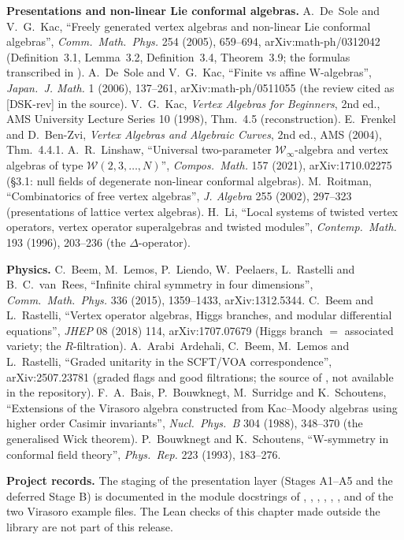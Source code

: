 \textbf{Presentations and non-linear Lie conformal algebras.} A.~De~Sole and V.~G.~Kac, ``Freely generated vertex algebras and
non-linear Lie conformal algebras'', \emph{Comm.\ Math.\ Phys.} 254 (2005), 659--694, arXiv:math-ph/0312042 (Definition~3.1,
Lemma~3.2, Definition~3.4, Theorem~3.9; the formulas transcribed in ). A.~De~Sole and V.~G.~Kac, ``Finite vs affine
W-algebras'', \emph{Japan.\ J. Math.} 1 (2006), 137--261, arXiv:math-ph/0511055 (the review cited as [DSK-rev] in the source).
V.~G.~Kac, \emph{Vertex Algebras for Beginners}, 2nd ed., AMS University Lecture Series 10 (1998), Thm.~4.5 (reconstruction).
E.~Frenkel and D.~Ben-Zvi, \emph{Vertex Algebras and Algebraic Curves}, 2nd ed., AMS (2004), Thm.~4.4.1. A.~R.~Linshaw,
``Universal two-parameter $\mathcal W_\infty$-algebra and vertex algebras of type $\mathcal W(2,3,\dots,N)$'', \emph{Compos.\ Math.} 157
(2021), arXiv:1710.02275 (§3.1: null fields of degenerate non-linear conformal algebras). M.~Roitman, ``Combinatorics of free vertex
algebras'', \emph{J. Algebra} 255 (2002), 297--323 (presentations of lattice vertex algebras). H.~Li, ``Local systems of twisted
vertex operators, vertex operator superalgebras and twisted modules'', \emph{Contemp.\ Math.} 193 (1996), 203--236 (the
$\Delta$-operator).

\textbf{Physics.} C.~Beem, M.~Lemos, P.~Liendo, W.~Peelaers, L.~Rastelli and B.~C.~van~Rees, ``Infinite chiral symmetry in four
dimensions'', \emph{Comm.\ Math.\ Phys.} 336 (2015), 1359--1433, arXiv:1312.5344. C.~Beem and L.~Rastelli, ``Vertex operator
algebras, Higgs branches, and modular differential equations'', \emph{JHEP} 08 (2018) 114, arXiv:1707.07679 (Higgs branch $=$
associated variety; the $R$-filtration). A.~Arabi~Ardehali, C.~Beem, M.~Lemos and L.~Rastelli, ``Graded unitarity in the SCFT/VOA
correspondence'', arXiv:2507.23781 (graded flags and good filtrations; the source of , not available in the
repository). F.~A.~Bais, P.~Bouwknegt, M.~Surridge and K.~Schoutens, ``Extensions of the Virasoro algebra constructed from
Kac--Moody algebras using higher order Casimir invariants'', \emph{Nucl.\ Phys.\ B} 304 (1988), 348--370 (the generalised Wick
theorem). P.~Bouwknegt and K.~Schoutens, ``W-symmetry in conformal field theory'', \emph{Phys.\ Rep.} 223 (1993), 183--276.

\sloppy
\textbf{Project records.} The staging of the presentation layer (Stages A1--A5 and the deferred Stage B) is documented in the module
docstrings of , , ,
, , ,  and
of the two Virasoro example files. The Lean checks of this chapter made outside the library are not part of this release.

\endgroup
